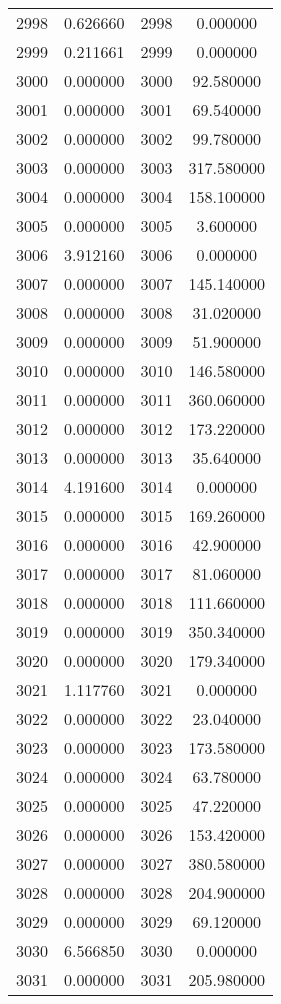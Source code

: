 \documentclass[12pt]{article}
\begin{document}
\begin{longtable}{@{}cccc@{}}
2998 & 0.626660 & 2998 & 0.000000 \\
2999 & 0.211661 & 2999 & 0.000000 \\
3000 & 0.000000 & 3000 & 92.580000 \\
3001 & 0.000000 & 3001 & 69.540000 \\
3002 & 0.000000 & 3002 & 99.780000 \\
3003 & 0.000000 & 3003 & 317.580000 \\
3004 & 0.000000 & 3004 & 158.100000 \\
3005 & 0.000000 & 3005 & 3.600000 \\
3006 & 3.912160 & 3006 & 0.000000 \\
3007 & 0.000000 & 3007 & 145.140000 \\
3008 & 0.000000 & 3008 & 31.020000 \\
3009 & 0.000000 & 3009 & 51.900000 \\
3010 & 0.000000 & 3010 & 146.580000 \\
3011 & 0.000000 & 3011 & 360.060000 \\
3012 & 0.000000 & 3012 & 173.220000 \\
3013 & 0.000000 & 3013 & 35.640000 \\
3014 & 4.191600 & 3014 & 0.000000 \\
3015 & 0.000000 & 3015 & 169.260000 \\
3016 & 0.000000 & 3016 & 42.900000 \\
3017 & 0.000000 & 3017 & 81.060000 \\
3018 & 0.000000 & 3018 & 111.660000 \\
3019 & 0.000000 & 3019 & 350.340000 \\
3020 & 0.000000 & 3020 & 179.340000 \\
3021 & 1.117760 & 3021 & 0.000000 \\
3022 & 0.000000 & 3022 & 23.040000 \\
3023 & 0.000000 & 3023 & 173.580000 \\
3024 & 0.000000 & 3024 & 63.780000 \\
3025 & 0.000000 & 3025 & 47.220000 \\
3026 & 0.000000 & 3026 & 153.420000 \\
3027 & 0.000000 & 3027 & 380.580000 \\
3028 & 0.000000 & 3028 & 204.900000 \\
3029 & 0.000000 & 3029 & 69.120000 \\
3030 & 6.566850 & 3030 & 0.000000 \\
3031 & 0.000000 & 3031 & 205.980000 \\

\end{longtable}
\end{document}
